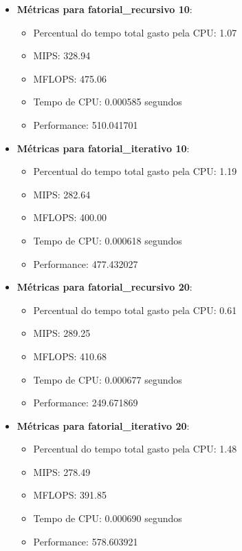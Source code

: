 \documentclass[12pt]{article}
\begin{document}
\begin{itemize}
    \item \textbf{Métricas para fatorial\_recursivo 10}:
    \begin{itemize}
        \item Percentual do tempo total gasto pela CPU: 1.07
        \item MIPS: 328.94
        \item MFLOPS: 475.06
        \item Tempo de CPU: 0.000585 segundos
        \item Performance: 510.041701
    \end{itemize}

    \item \textbf{Métricas para fatorial\_iterativo 10}:
    \begin{itemize}
        \item Percentual do tempo total gasto pela CPU: 1.19
        \item MIPS: 282.64
        \item MFLOPS: 400.00
        \item Tempo de CPU: 0.000618 segundos
        \item Performance: 477.432027
    \end{itemize}

    \item \textbf{Métricas para fatorial\_recursivo 20}:
    \begin{itemize}
        \item Percentual do tempo total gasto pela CPU: 0.61
        \item MIPS: 289.25
        \item MFLOPS: 410.68
        \item Tempo de CPU: 0.000677 segundos
        \item Performance: 249.671869
    \end{itemize}

    \item \textbf{Métricas para fatorial\_iterativo 20}:
    \begin{itemize}
        \item Percentual do tempo total gasto pela CPU: 1.48
        \item MIPS: 278.49
        \item MFLOPS: 391.85
        \item Tempo de CPU: 0.000690 segundos
        \item Performance: 578.603921
    \end{itemize}


\end{itemize}
\end{document}
